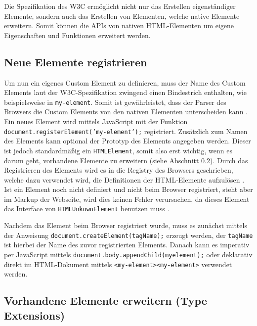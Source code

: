 Die Spezifikation des \ac{W3C} ermöglicht nicht nur das Erstellen eigenständiger Elemente, sondern auch das Erstellen von Elementen, welche native Elemente erweitern. Somit können die \ac{API}s von nativen \ac{HTML}-Elementen um eigene Eigenschaften und Funktionen erweitert werden.


\subsection{Neue Elemente registrieren}\label{neue-elemente-registrieren}

Um nun ein eigenes Custom Element zu definieren, muss der Name des Custom Elements laut der \ac{W3C}-Spezifikation zwingend einen Bindestrich enthalten, wie beispielsweise in \texttt{my-element}. Somit ist gewährleistet, dass der Parser des Browsers die Custom Elements von den nativen Elementen unterscheiden kann \cite{citeulike:13845061}. Ein neues Element wird mittels JavaScript mit der Funktion \texttt{document.registerElement('my-element');} registriert. Zusätzlich zum Namen des Elements kann optional der Prototyp des Elements angegeben werden. Dieser ist jedoch standardmäßig ein \texttt{HTMLElement}, somit also erst wichtig, wenn es darum geht, vorhandene Elemente zu erweitern (siehe Abschnitt \ref{vorhandene-elemente-erweitern-type-extensions}). Durch das Registrieren des Elements wird es in die Registry des Browsers geschrieben, welche dazu verwendet wird, die Definitionen der \ac{HTML}-Elemente aufzulösen \cite{citeulike:13844982}. Ist ein Element noch nicht definiert und nicht beim Browser registriert, steht aber im Markup der Webseite, wird dies keinen Fehler verursachen, da dieses Element das Interface von \texttt{HTMLUnkownElement} benutzen muss \cite{citeulike:13851253}.

Nachdem das Element beim Browser registriert wurde, muss es zunächst mittels der Anweisung \texttt{document.createElement(tagName);} erzeugt werden, der \texttt{tagName} ist hierbei der Name des zuvor registrierten Elements. Danach kann es imperativ per JavaScript mittels \texttt{document.body.appendChild(myelement);} oder deklarativ direkt im \ac{HTML}-Dokument mittels \texttt{\textless{}my-element\textgreater{}\textless{}my-element\textgreater{}} verwendet werden.

\noindent \cite[S. 127-138]{citeulike:13844975}


\subsection{Vorhandene Elemente erweitern (Type Extensions)}\label{vorhandene-elemente-erweitern-type-extensions}

